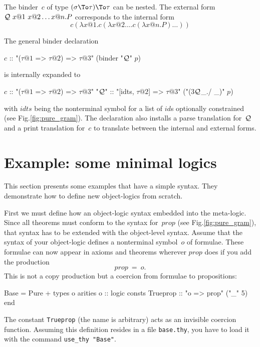 The binder~$c$ of type $(\sigma \To \tau) \To \tau$ can be nested.  The
external form ${\cal Q}~x@1~x@2 \ldots x@n. P$ corresponds to the internal form
\[ c(\lambda x@1. c(\lambda x@2. \ldots c(\lambda x@n. P) \ldots)) \]

\medskip
The general binder declaration
\begin{ttbox}
\(c\)    :: "(\(\tau@1\) => \(\tau@2\)) => \(\tau@3\)"   (binder "\({\cal Q}\)" \(p\))
\end{ttbox}
is internally expanded to
\begin{ttbox}
\(c\)    :: "(\(\tau@1\) => \(\tau@2\)) => \(\tau@3\)"
"\({\cal Q}\)"\hskip-3pt  :: "[idts, \(\tau@2\)] => \(\tau@3\)"   ("(3\({\cal Q}\)_./ _)" \(p\))
\end{ttbox}
with $idts$ being the nonterminal symbol for a list of $id$s optionally
constrained (see Fig.\ts\ref{fig:pure_gram}).  The declaration also
installs a parse translation for~${\cal Q}$ and a print
translation for~$c$ to translate between the
internal and external forms.
\endgroup



\section{Example: some minimal logics} \label{sec:min_logics}
This section presents some examples that have a simple syntax.  They
demonstrate how to define new object-logics from scratch.

First we must define how an object-logic syntax embedded into the
meta-logic.  Since all theorems must conform to the syntax for~$prop$ (see
Fig.\ts\ref{fig:pure_gram}), that syntax has to be extended with the
object-level syntax.  Assume that the syntax of your object-logic defines a
nonterminal symbol~$o$ of formulae.  These formulae can now appear in
axioms and theorems wherever $prop$ does if you add the production
\[ prop ~=~ o. \]
This is not a copy production but a coercion from formulae to propositions:
\begin{ttbox}
Base = Pure +
types
  o
arities
  o :: logic
consts
  Trueprop :: "o => prop"   ("_" 5)
end
\end{ttbox}
The constant {\tt Trueprop} (the name is arbitrary) acts as an invisible
coercion function.  Assuming this definition resides in a file {\tt base.thy},
you have to load it with the command {\tt use_thy "Base"}.

